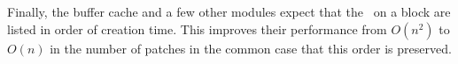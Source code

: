 
Finally, the buffer cache and a few other modules expect that the
\patches\ on a block are listed in order of creation time.
%
This improves their performance from $O(n^2)$ to $O(n)$ in the number of
patches in the common case that this order is preserved.


\begin{comment}
Several functions in \Kudos\ iterate over lists of \chdescs\ looking for either
a single \chdesc\ or set of \chdescs\ satisfying some property, or trying to
process all the \chdescs\ in the list in some order determined by the dependency
graph. It is generally the case that the \chdescs\ satisfying the property or
the order in which the \chdescs\ should be processed can be determined very
quickly by keeping the lists sorted. For instance, the library function which
rolls \chdescs\ back needs to perform the rollbacks essentially in inverse
creation order, so that rolling back a \chdesc\ which has since been overwritten
by a later \chdesc\ does the right thing. Keeping the list of all \chdescs\ on a
block sorted in creation order (which is very easy) makes this an efficient
operation, while it might otherwise take $O(n^2)$ time to execute. Similarly,
many \chdesc\ merging functions need to find for a given block some \chdesc\
which has no \befores\ on the same block, and the oldest \chdesc\ on a block
always satisfies this requirement.
\end{comment}
